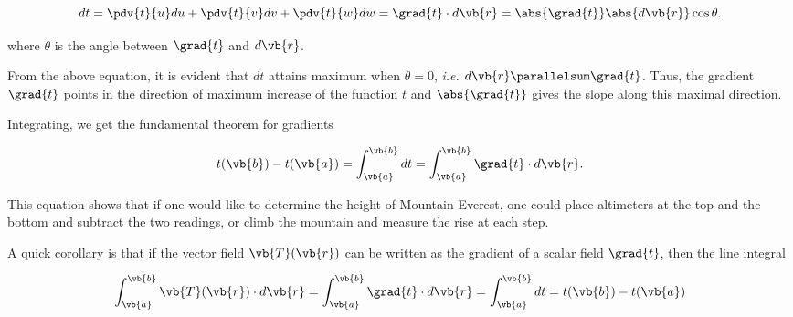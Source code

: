 \documentclass[english,a4paper,12pt]{report}
\begin{document}
\begin{equation}
    dt = \pdv{t}{u}du + \pdv{t}{v}dv + \pdv{t}{w}dw = \grad{t} \cdot d\vb{r}  = \abs{\grad{t} }\abs{d \vb{r} }\cos \theta   . \label{dt} 
\end{equation}

where \(\theta\) is the angle between \(\grad{t}\) and \(d\vb{r}\).
	
From the above equation, it is evident that \(dt\) attains maximum when \(\theta = 0\), \textit{i.e.} \(d\vb{r} \parallelsum \grad{t}\). Thus, the gradient \(\grad{t}\) points in the direction of maximum increase of the function \(t\) and \(\abs{\grad{t}}\) gives the slope along this maximal direction.


	
Integrating, we get the fundamental theorem for gradients

\begin{equation} 
	t(\vb{b}) - t(\vb{a}) = \int_{\vb{a} }^{\vb{b} } dt = \int_{\vb{a}}^{\vb{b}} \grad{t} \cdot d\vb{r}. 
\end{equation}
	
This equation shows that if one would like to determine the height of Mountain Everest, one could place altimeters at the top and the bottom and subtract the two readings, or climb the mountain and measure the rise at each step.

A quick corollary is that if the vector field \(\vb{T} (\vb{r} )\) can be written as the gradient of a scalar field \(\grad{t}  \), then the line integral 

\begin{equation}
	\int_{\vb{a} }^{\vb{b} } \vb{T}(\vb{r} ) \cdot  d\vb{r}  = \int_{\vb{a} }^{\vb{b} } \grad{t} \cdot d\vb{r} = \int_{\vb{a} }^{\vb{b} }dt = t(\vb{b} ) - t(\vb{a} )
\end{equation}
\end{document}
